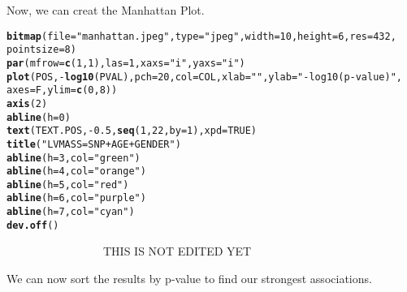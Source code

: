 \documentclass[11pt]{article}\usepackage[]{graphicx}\usepackage[]{color}
\makeatletter
\newcommand{\hlnum}[1]{\textcolor[rgb]{0.686,0.059,0.569}{#1}}%
\newcommand{\hlstr}[1]{\textcolor[rgb]{0.192,0.494,0.8}{#1}}%
\newcommand{\hlopt}[1]{\textcolor[rgb]{0,0,0}{#1}}%
\newcommand{\hlstd}[1]{\textcolor[rgb]{0.345,0.345,0.345}{#1}}%
\newcommand{\hlkwc}[1]{\textcolor[rgb]{0.333,0.667,0.333}{#1}}%
\newcommand{\hlkwd}[1]{\textcolor[rgb]{0.737,0.353,0.396}{\textbf{#1}}}%
\newenvironment{kframe}{%
 \def\at@end@of@kframe{}%
 \ifinner\ifhmode%
  \def\at@end@of@kframe{\end{minipage}}%
  \begin{minipage}{\columnwidth}%
 \fi\fi%
 \def\FrameCommand##1{\hskip\@totalleftmargin \hskip-\fboxsep
 \colorbox{shadecolor}{##1}\hskip-\fboxsep
     \hskip-\linewidth \hskip-\@totalleftmargin \hskip\columnwidth}%
 \MakeFramed {\advance\hsize-\width
   \@totalleftmargin\z@ \linewidth\hsize
   \@setminipage}}%
 {\par\unskip\endMakeFramed%
 \at@end@of@kframe}
\newenvironment{knitrout}{}{} %
\makeatother
\begin{document}
Now, we can creat the Manhattan Plot.

\begin{knitrout}
\color{fgcolor}\begin{kframe}
\begin{alltt}
\hlkwd{bitmap}\hlstd{(}\hlkwc{file} \hlstd{=} \hlstr{"manhattan.jpeg"}\hlstd{,} \hlkwc{type} \hlstd{=} \hlstr{"jpeg"}\hlstd{,} \hlkwc{width} \hlstd{=} \hlnum{10}\hlstd{,} \hlkwc{height} \hlstd{=} \hlnum{6}\hlstd{,} \hlkwc{res} \hlstd{=} \hlnum{432}\hlstd{,}
    \hlkwc{pointsize} \hlstd{=} \hlnum{8}\hlstd{)}
\hlkwd{par}\hlstd{(}\hlkwc{mfrow} \hlstd{=} \hlkwd{c}\hlstd{(}\hlnum{1}\hlstd{,} \hlnum{1}\hlstd{),} \hlkwc{las} \hlstd{=} \hlnum{1}\hlstd{,} \hlkwc{xaxs} \hlstd{=} \hlstr{"i"}\hlstd{,} \hlkwc{yaxs} \hlstd{=} \hlstr{"i"}\hlstd{)}
\hlkwd{plot}\hlstd{(POS,} \hlopt{-}\hlkwd{log10}\hlstd{(PVAL),} \hlkwc{pch} \hlstd{=} \hlnum{20}\hlstd{,} \hlkwc{col} \hlstd{= COL,} \hlkwc{xlab} \hlstd{=} \hlstr{""}\hlstd{,} \hlkwc{ylab} \hlstd{=} \hlstr{"-log10(p-value)"}\hlstd{,}
    \hlkwc{axes} \hlstd{= F,} \hlkwc{ylim} \hlstd{=} \hlkwd{c}\hlstd{(}\hlnum{0}\hlstd{,} \hlnum{8}\hlstd{))}
\hlkwd{axis}\hlstd{(}\hlnum{2}\hlstd{)}
\hlkwd{abline}\hlstd{(}\hlkwc{h} \hlstd{=} \hlnum{0}\hlstd{)}
\hlkwd{text}\hlstd{(TEXT.POS,} \hlopt{-}\hlnum{0.5}\hlstd{,} \hlkwd{seq}\hlstd{(}\hlnum{1}\hlstd{,} \hlnum{22}\hlstd{,} \hlkwc{by} \hlstd{=} \hlnum{1}\hlstd{),} \hlkwc{xpd} \hlstd{=} \hlnum{TRUE}\hlstd{)}
\hlkwd{title}\hlstd{(}\hlstr{"LVMASS = SNP + AGE + GENDER"}\hlstd{)}
\hlkwd{abline}\hlstd{(}\hlkwc{h} \hlstd{=} \hlnum{3}\hlstd{,} \hlkwc{col} \hlstd{=} \hlstr{"green"}\hlstd{)}
\hlkwd{abline}\hlstd{(}\hlkwc{h} \hlstd{=} \hlnum{4}\hlstd{,} \hlkwc{col} \hlstd{=} \hlstr{"orange"}\hlstd{)}
\hlkwd{abline}\hlstd{(}\hlkwc{h} \hlstd{=} \hlnum{5}\hlstd{,} \hlkwc{col} \hlstd{=} \hlstr{"red"}\hlstd{)}
\hlkwd{abline}\hlstd{(}\hlkwc{h} \hlstd{=} \hlnum{6}\hlstd{,} \hlkwc{col} \hlstd{=} \hlstr{"purple"}\hlstd{)}
\hlkwd{abline}\hlstd{(}\hlkwc{h} \hlstd{=} \hlnum{7}\hlstd{,} \hlkwc{col} \hlstd{=} \hlstr{"cyan"}\hlstd{)}
\hlkwd{dev.off}\hlstd{()}
\end{alltt}
\end{kframe}
\end{knitrout}



\newpage

~~~~~~~~~~~~~~~~~THIS IS NOT EDITED YET~~~~~~~~~~~~~~~~~~~~~

We can now sort the results by p-value to find our strongest associations.
\end{document}
